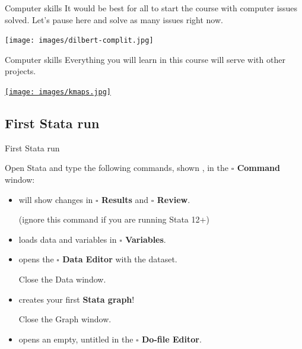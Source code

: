 \documentclass{beamer}
\begin{document}
	\begin{frame}[t]{Computer skills}
		It would be best for all to start the course with computer issues solved. Let's pause here and solve as many issues right now.\vspace{1em}
	
		\texttt{[image: images/dilbert-complit.jpg]}

	\end{frame}

	\begin{frame}[t]{Computer skills}
		Everything you will learn in this course will serve with other projects.\vspace{1em}
	
		\href{http://f.briatte.org/research/kmaps/}{\texttt{[image: images/kmaps.jpg]}}

	\end{frame}

	\subsection{First Stata run}

	\begin{frame}[t]{First Stata run}
	
	Open Stata and type the following commands, shown , in the \textbf{$\square$ Command} window:
	
	\begin{itemize}
		\item {} will show changes in \textbf{$\square$ Results} and \textbf{$\square$ Review}.
			
			(ignore this command if you are running Stata 12+)
				
		\item {} loads data and variables in \textbf{$\square$ Variables}.
				
		\item {} opens the \textbf{$\square$ Data Editor}  with the  dataset.

		Close the Data window.
		
		\item {} creates your first \textbf{Stata graph}!
		
		Close the Graph window.
		
		\item {} opens an empty, untitled  in the \textbf{$\square$ Do-file Editor}.
	\end{itemize}
	
	\end{frame}
	
\end{document}
